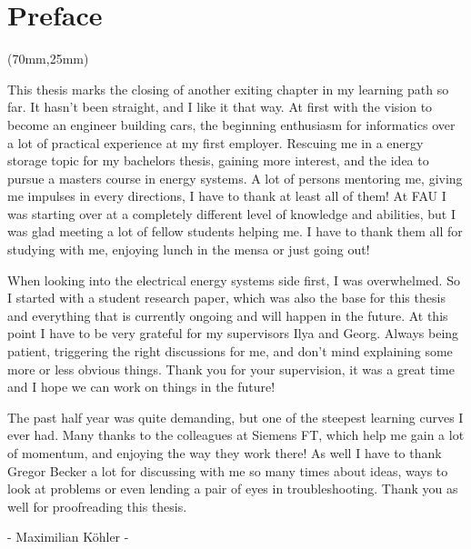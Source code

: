 
\begingroup

\chapter*{Preface}

\thispagestyle{empty}

\begin{textblock*}{.7\textwidth}(70mm,25mm)
    \prefacelogo
\end{textblock*}

This thesis marks the closing of another exiting chapter in my learning path so far.
It hasn't been straight, and I like it that way.
At first with the vision to become an engineer building cars, the beginning enthusiasm for informatics over a lot of practical experience at my first employer.
Rescuing me in a energy storage topic for my bachelors thesis, gaining more interest, and the idea to pursue a masters course in energy systems.
A lot of persons mentoring me, giving me impulses in every directions, I have to thank at least all of them!
At FAU I was starting over at a completely different level of knowledge and abilities, but I was glad meeting a lot of fellow students helping me.
I have to thank them all for studying with me, enjoying lunch in the mensa or just going out!

When looking into the electrical energy systems side first, I was overwhelmed.
So I started with a student research paper, which was also the base for this thesis and everything that is currently ongoing and will happen in the future.
At this point I have to be very grateful for my supervisors Ilya and Georg.
Always being patient, triggering the right discussions for me, and don't mind explaining some more or less obvious things.
Thank you for your supervision, it was a great time and I hope we can work on things in the future!

The past half year was quite demanding, but one of the steepest learning curves I ever had.
Many thanks to the colleagues at Siemens FT, which help me gain a lot of momentum, and enjoying the way they work there!
As well I have to thank Gregor Becker a lot for discussing with me so many times about ideas, ways to look at problems or even lending a pair of eyes in troubleshooting. 
Thank you as well for proofreading this thesis.

\begin{center}
    - Maximilian Köhler -
\end{center}

\endgroup